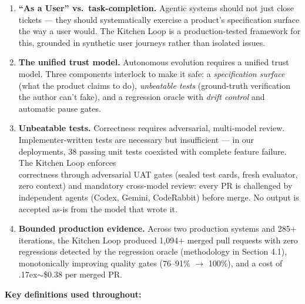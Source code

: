 \documentclass[11pt,a4paper]{article}
\newcommand{\roughly}{{\textraisebox{.17ex}{$\scriptstyle\sim$}}}
\newcommand{\textraisebox}[2]{\leavevmode\raise#1\hbox{#2}}
\begin{document}
\begin{enumerate}
\def\labelenumi{\arabic{enumi}.}
\item
  \textbf{``As a User'' vs.~task-completion.} Agentic systems should not just close tickets --- they should systematically exercise a product's specification surface the way a user would. The Kitchen Loop is a production-tested framework for this, grounded in synthetic user journeys rather than isolated issues.
\item
  \textbf{The unified trust model.} Autonomous evolution requires a unified trust model. Three components interlock to make it safe: a \emph{specification surface} (what the product claims to do), \emph{unbeatable tests} (ground-truth verification the author can't fake), and a regression oracle with \emph{drift control} and automatic pause gates.
\item
  \textbf{Unbeatable tests.} Correctness requires adversarial, multi-model review. Implementer-written tests are necessary but insufficient --- in our deployments, 38 passing unit tests coexisted with complete feature failure. The Kitchen Loop enforces\\
  correctness through adversarial UAT gates (sealed test cards, fresh evaluator, zero context) and mandatory cross-model review: every PR is challenged by independent agents (Codex, Gemini, CodeRabbit) before merge. No output is accepted as-is from the model that wrote it.
\item
  \textbf{Bounded production evidence.} Across two production systems and 285+ iterations, the Kitchen Loop produced 1,094+ merged pull requests with zero regressions detected by the regression oracle (methodology in Section 4.1), monotonically improving quality gates (76--91\% $\rightarrow$ 100\%), and a cost of \roughly\$0.38 per merged PR.
\end{enumerate}

\vspace{0.8em}
\textbf{Key definitions used throughout:}
\end{document}
